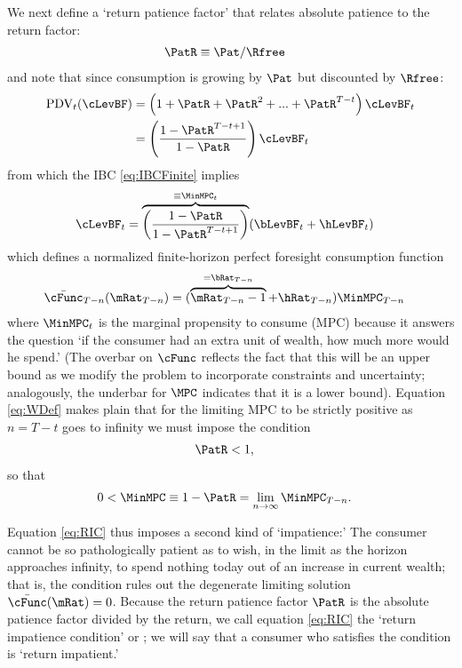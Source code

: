 \documentclass[./BufferStockTheory.tex]{subfiles}
\begin{document}
We next define a `return patience factor' that relates absolute patience to the return factor:
\begin{align}
 \PatR  & \equiv  {\Pat}/\Rfree \label{eq:PatR}
\end{align}
and note that since consumption is growing by $\Pat$ but discounted by $\Rfree$:
\begin{align}
  \text{PDV}_{t}(\cLevBF)  & = \left(1+\PatR+\PatR^{2}+...+ \PatR^{T-t}\right)\cLevBF_{t} \notag
\\  & = \left(\frac{1-\PatR^{T-t+1}}{1-\PatR}\right)\cLevBF_{t}
\end{align}
from which the IBC \eqref{eq:IBCFinite} implies
\begin{align}
  \cLevBF_{t}  & = \overbrace{\left(\frac{1-\PatR}{1-\PatR^{T-t+1}}\right)}^{\equiv \MinMPC_{t}}
(\bLevBF_{t}+\hLevBF_{t})   \label{eq:WDef}
\end{align}
which defines a normalized finite-horizon perfect foresight consumption function
\begin{align}
  \bar{\cFunc}_{T-n}(\mRat_{T-n})  & = (\overbrace{\mRat_{T-n}-1}^{=\bRat_{T-n}}+\hRat_{T-n})\MinMPC_{T-n}
\end{align}
where $\MinMPC_{t}$ is the marginal propensity to consume (MPC) because it answers the
question `if the consumer had an extra unit of wealth, how much more would he spend.'
(The overbar on $\cFunc$ reflects the fact that this will be an upper bound as we modify the problem to incorporate constraints and uncertainty; analogously, the underbar for $\MPC$ indicates that it is a lower bound).
Equation \eqref{eq:WDef} makes plain that for the limiting
MPC to be strictly positive as $n=T-t$ goes to infinity we must impose the
condition \hypertarget{RIC}{}
\begin{align}
\PatR  & < 1   \label{eq:RIC},
\end{align}
so that
\begin{align}
   0 <  \MinMPC  & \equiv   1-\PatR = \lim_{n \rightarrow \infty} \MinMPC_{T-n} \label{eq:MinMPCDef}
.
\end{align}

Equation \eqref{eq:RIC} thus imposes a second kind of `impatience:' The consumer cannot be so pathologically patient as to wish, in the limit as the horizon approaches infinity, to spend nothing today out of an increase in current wealth; that is, the condition rules out the degenerate limiting solution $\bar{\cFunc}(\mRat)=0$.  Because the return patience factor $\PatR$ is the absolute patience factor divided by the return, we call equation \eqref{eq:RIC} the `return impatience condition' or \RIC; we will say that a consumer who satisfies the condition is `return impatient.'
\end{document}

